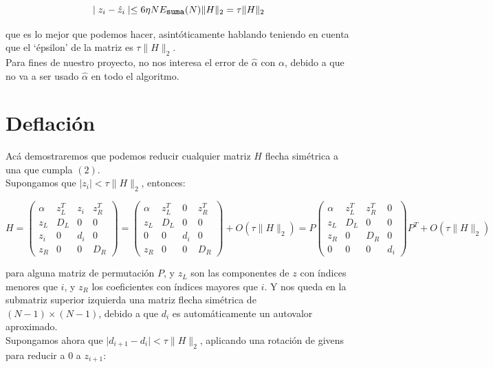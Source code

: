 \documentclass[11pt,a4paper]{article}
\begin{document}
$$\mid z_i - \hat{z}_i \mid \leq 6 \eta N E_{\texttt{\small suma}}(N) \| H\|_2= \tau \|H\|_2$$

que es lo mejor que podemos hacer, asintóticamente hablando teniendo en cuenta que el `épsilon' de la matriz es $\tau \|H\|_2$.\\

Para fines de nuestro proyecto, no nos interesa el error de $\hat{\alpha}$ con $\alpha$, debido a que no va a ser usado $\hat{\alpha}$ en todo el algoritmo.\\

\section{Deflación}


Acá demostraremos que podemos reducir cualquier matriz $H$ flecha simétrica a una que cumpla $(2)$. \\

Supongamos que $\mid z_i \mid < \tau \|H\|_2$, entonces:

$$H=\begin{pmatrix} 
    \alpha & z_L^T & z_i & z_R^T \\
    z_L & D_L & 0 & 0\\
    z_i & 0 & d_i& 0 \\
    z_R & 0 & 0 & D_R 
\end{pmatrix}=\begin{pmatrix} 
    \alpha & z_L^T & 0 & z_R^T \\
    z_L & D_L & 0 & 0\\
    0 & 0 & d_i& 0 \\
    z_R & 0 & 0 & D_R 
\end{pmatrix} +O(\tau \|H\|_2) = P  \begin{pmatrix} 
    \alpha & z_L^T & z_R^T & 0 \\
    z_L & D_L & 0 & 0\\
    z_R & 0 & D_R & 0 \\
    0 & 0 & 0 & d_i
\end{pmatrix}  P^T +O(\tau \|H\|_2)$$

para alguna matriz de permutación $P$, y $z_L$ son las componentes de $z$ con índices menores que $i$, y $z_R$ los coeficientes con índices mayores que $i$. Y nos queda en la submatriz superior izquierda una matriz flecha simétrica de $(N-1) \times (N-1)$, debido a que $d_i$ es automáticamente un autovalor aproximado.\\

Supongamos ahora que $\mid d_{i+1}-d_i \mid < \tau \|H\|_2$, aplicando una rotación de givens para reducir a $0$ a $z_{i+1}$:
\end{document}

